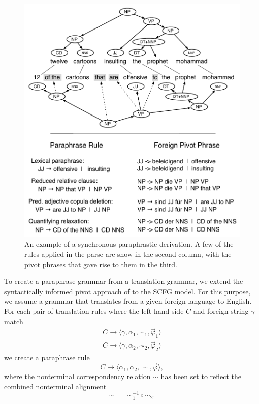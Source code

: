 \documentclass[11pt]{article}
\begin{document}
\begin{figure}[!t]
\begin{center}
\includegraphics[width=0.99\linewidth]{figures/example_compression_1col.pdf}
\end{center}
\caption{An example of a synchronous paraphrastic derivation. A few of
  the rules applied in the parse are show in the second column, with
  the pivot phrases that gave rise to them in the third.}
\end{figure}

To create a paraphrase grammar from a translation grammar, we extend
the syntactically informed pivot approach of
 to the SCFG model. For this purpose, we
assume a grammar that translates from a given foreign language to
English. For each pair of translation rules where the left-hand side
$C$ and foreign string $\gamma$ match
\begin{eqnarray*}
C \rightarrow \langle \gamma, \alpha_1, \sim_1, \vec{\varphi}_1 \rangle \\
C \rightarrow \langle \gamma, \alpha_2, \sim_2, \vec{\varphi}_2 \rangle
\end{eqnarray*}
we create a paraphrase rule
\begin{equation*}
C \rightarrow \langle \alpha_1, \alpha_2, \sim, \vec{\varphi} \rangle ,
\end{equation*}
where the nonterminal correspondency relation $\sim$ has been set to
reflect the combined nonterminal alignment
\begin{equation*}
\sim ~ = ~ \sim_1^{-1} \circ \sim_2 .
\end{equation*}
\end{document}
